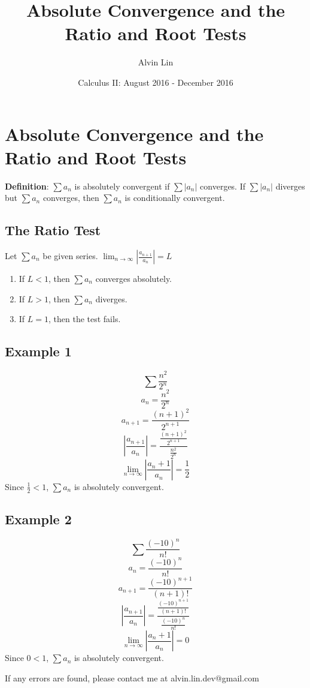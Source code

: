 \documentclass[letterpaper, 12pt]{article}
\title{Absolute Convergence and the Ratio and Root Tests}
\author{Alvin Lin}
\date{Calculus II: August 2016 - December 2016}
\begin{document}
\maketitle

\section*{Absolute Convergence and the Ratio and Root Tests}
\textbf{Definition}: \( \sum{a_{n}} \) is absolutely convergent if
\( \sum|a_{n}| \) converges. If \( \sum|a_{n}| \) diverges but
\( \sum{a_{n}} \) converges, then \( \sum{a_{n}} \) is conditionally convergent.

\subsection*{The Ratio Test}
Let \( \sum{a_{n}} \) be given series.
\( \lim_{n\to\infty}|\frac{a_{n+1}}{a_{n}}| = L \)
\begin{enumerate}
  \item If \( L < 1 \), then \( \sum{a_{n}} \) converges absolutely.
  \item If \( L > 1 \), then \( \sum{a_{n}} \) diverges.
  \item If \( L = 1 \), then the test fails.
\end{enumerate}

\subsection*{Example 1}
\[ \sum\frac{n^{2}}{2^{n}} \]
\[ a_{n} = \frac{n^{2}}{2^{n}} \]
\[ a_{n+1} = \frac{(n+1)^{2}}{2^{n+1}} \]
\[ |\frac{a_{n+1}}{a_{n}}| =
   \frac{\frac{(n+1)^{2}}{2^{n+1}}}{\frac{n^{2}}{2^{n}}} \]
\[ \lim_{n\to\infty}|\frac{a_{n}+1}{a_{n}}| = \frac{1}{2} \]
Since \( \frac{1}{2} < 1 \), \( \sum{a_{n}} \) is absolutely convergent.

\subsection*{Example 2}
\[ \sum\frac{(-10)^{n}}{n!} \]
\[ a_{n} = \frac{(-10)^{n}}{n!} \]
\[ a_{n+1} = \frac{(-10)^{n+1}}{(n+1)!} \]
\[ |\frac{a_{n+1}}{a_{n}}| =
   \frac{\frac{(-10)^{n+1}}{(n+1)!}}{\frac{(-10)^{n}}{n!}} \]
\[ \lim_{n\to\infty}|\frac{a_{n}+1}{a_{n}}| = 0 \]
Since \( 0 < 1 \), \( \sum{a_{n}} \) is absolutely convergent.

\begin{center}
  If any errors are found, please contact me at alvin.lin.dev@gmail.com
\end{center}
\end{document}
